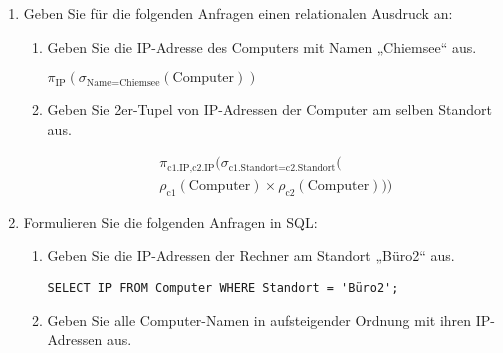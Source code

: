 \documentclass{lehramt-informatik}
\begin{document}
\begin{enumerate}


\item Geben Sie für die folgenden Anfragen einen relationalen Ausdruck
an:

\begin{enumerate}


\item Geben Sie die IP-Adresse des Computers mit Namen „Chiemsee“ aus.

\begin{antwort}
$\pi_{\text{IP}}(\sigma_{\text{Name} = \text{Chiemsee}}(\text{Computer}))$
\end{antwort}


\item Geben Sie 2er-Tupel von IP-Adressen der Computer am selben
Standort aus.

\begin{antwort}
\begin{multline*}
\pi_{\text{c1.IP},\text{c2.IP}}(
  \sigma_{\text{c1.Standort} = \text{c2.Standort}}(\\
    \rho_{\text{c1}} (\text{Computer})
    \times
    \rho_{\text{c2}} (\text{Computer})
  )
)
\end{multline*}
\end{antwort}
\end{enumerate}


\item Formulieren Sie die folgenden Anfragen in SQL:

\begin{enumerate}


\item Geben Sie die IP-Adressen der Rechner am Standort „Büro2“ aus.

\begin{antwort}
\begin{verbatim}
SELECT IP FROM Computer WHERE Standort = 'Büro2';
\end{verbatim}
\end{antwort}


\item Geben Sie alle Computer-Namen in aufsteigender Ordnung mit ihren
IP-Adressen aus.


\end{enumerate}
\end{enumerate}
\end{document}
